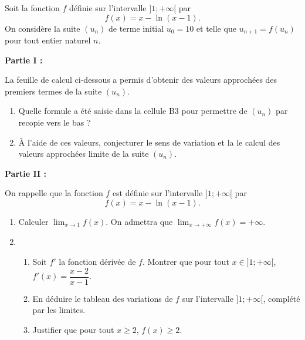 Soit la fonction $f$ définie sur l'intervalle $]1; +\infty[$ par \[f(x) = x - \ln (x - 1).\]
%
On considère la suite $\left(u_n\right)$ de terme initial $u_0 = 10$ et telle que $u_{n+1} = f\left(u_n\right)$ pour tout entier naturel $n$.

\bigskip

\textbf{Partie I :}

\medskip

La feuille de calcul ci-dessous a permis d'obtenir des valeurs approchées des premiers termes de la suite $\left(u_n\right)$.

\begin{center}
\end{center}

\begin{enumerate}
	\item Quelle formule a été saisie dans la cellule B3 pour permettre de $\left(u_n\right)$ par recopie vers le bas ?
	\item À l'aide de ces valeurs, conjecturer le sens de variation et la le calcul des valeurs approchées limite de la suite $\left(u_n\right)$.
\end{enumerate}

\textbf{Partie II :}

\medskip

On rappelle que la fonction $f$ est définie sur l'intervalle $]1; +\infty[$ par \[f(x) = x - \ln (x - 1).\]

\begin{enumerate}
	\item Calculer $\displaystyle\lim_{x \to 1} f(x)$. On admettra que $\displaystyle\lim_{x \to + \infty} f(x) = + \infty$.
	\item  
	\begin{enumerate}
		\item Soit $f'$ la fonction dérivée de $f$. Montrer que pour tout $x \in ]1; +\infty[$, $f'(x) = \dfrac{x - 2}{x - 1}$.
		\item En déduire le tableau des variations de $f$ sur l'intervalle $]1; +\infty[$, complété par les limites.
		\item Justifier que pour tout $x \geqslant  2$, $f(x) \geqslant  2$.
	\end{enumerate}
\end{enumerate}

